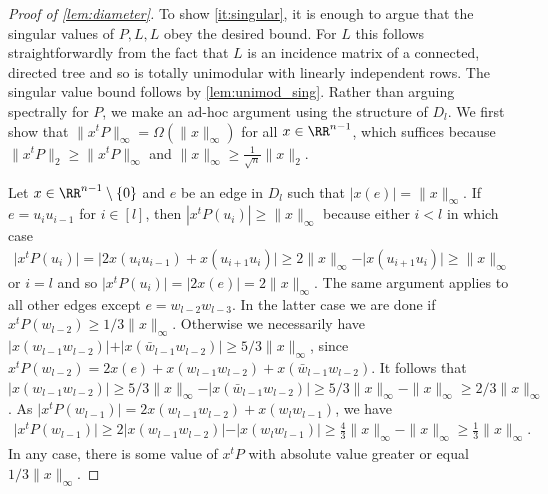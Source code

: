 \begin{proof}[Proof of \cref{lem:diameter}]
To show \cref{it:singular}, it is enough to argue that the singular values of $P, L, L$ obey the desired bound. For $L$ this follows straightforwardly from the fact that $L$ is an incidence matrix of a connected, directed tree and so is totally unimodular with linearly independent rows. The singular value bound follows by \cref{lem:unimod_sing}. Rather than arguing spectrally for $P$, we make an ad-hoc argument using the structure of $D_l$.
We first show that $\|x^t P\|_\infty = \Omega( \|x\|_\infty)$ for all $x \in \RR^{n-1}$, which suffices because $\|x^t P\|_2 \geq  \|x^tP\|_\infty$ and $\|x\|_\infty \geq \frac{1}{\sqrt{n}}\|x\|_2$.

Let $x \in \RR^{n-1} \setminus \lbrace 0 \rbrace$ and $e$ be an edge in $D_l$ such that $\vert x(e) \vert  = \| x \|_\infty$. If $e = u_iu_{i-1}$ for $i \in [l]$, then $|x^t P (u_{i})| \geq \| x \|_\infty$ because either $i < l$ in which case
	\begin{align*}
	\vert x^t P (u_{i }) \vert = \vert 2 x(u_{i}u_{i - 1}) + x(u_{i+1}u_{i}) \vert \geq 2\|x\|_\infty - \vert x(u_{i+1}u_{i}) \vert \geq \|x\|_\infty
	\end{align*}
or $i = l$ and so $\vert x^t P (u_{i}) \vert = \vert 2 x(e) \vert = 2 \|x\|_\infty$. The same argument applies to all other edges except $e = w_{l-2} w_{l-3}$. In the latter case we are done if $x^t P (w_{l-2}) \geq 1/3 \| x \|_\infty$. Otherwise we necessarily have $\vert x(w_{l-1} w_{l-2}) \vert + \vert x(\bar{w}_{l-1} w_{l-2}) \vert \geq 5/3 \|x\|_\infty$, since $x^t P(w_{l-2}) = 2x(e) + x(w_{l-1} w_{l-2}) + x(\bar{w}_{l-1} w_{l-2})$. It follows that $\vert x(w_{l-1} w_{l-2}) \vert \geq 5/3 \|x\|_\infty - \vert x(\bar{w}_{l-1} w_{l-2}) \vert \geq 5/3 \|x\|_\infty - \|x\|_\infty \geq 2/3 \|x\|_\infty$. As $\vert x^t P(w_{l-1}) \vert = 2  x(w_{l-1} w_{l-2})+ x(w_l w_{l-1}) $, we have 
	\begin{align*}
	\vert x^t P(w_{l-1}) \vert \geq 2 \vert x(w_{l-1} w_{l-2}) \vert - \vert x(w_l w_{l-1}) \vert \geq \frac{4}{3} \|x\|_\infty - \|x\|_\infty \geq \frac{1}{3} \|x\|_\infty.
	\end{align*}
In any case, there is some value of $x^t P$ with absolute value greater or equal $1/3 \|x\|_\infty$. 



\end{proof}
